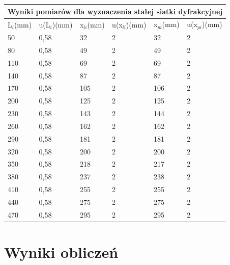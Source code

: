 \documentclass[12pt]{article}
\begin{document}
\begin{table}[!ht]
    \centering
    \begin{tabular}{|l|l|l|l|l|l|}
    \hline
    \multicolumn{6}{|l|}{Wyniki pomiarów dla wyznaczenia stałej siatki dyfrakcyjnej} \\
    \hline
        L$_i$(mm) & u(L$_i$)(mm) & x$_{li}$(mm) & u(x$_{li}$)(mm) & x$_{pi}$(mm) & u(x$_{pi}$)(mm) \\ \hline
        50 & 0,58 & 32 & 2 & 32 & 2 \\ \hline
        80 & 0,58 & 49 & 2 & 49 & 2 \\ \hline
        110 & 0,58 & 69 & 2 & 69 & 2 \\ \hline
        140 & 0,58 & 87 & 2 & 87 & 2 \\ \hline
        170 & 0,58 & 105 & 2 & 106 & 2 \\ \hline
        200 & 0,58 & 125 & 2 & 125 & 2 \\ \hline
        230 & 0,58 & 143 & 2 & 144 & 2 \\ \hline
        260 & 0,58 & 162 & 2 & 162 & 2 \\ \hline
        290 & 0,58 & 181 & 2 & 181 & 2 \\ \hline
        320 & 0,58 & 200 & 2 & 200 & 2 \\ \hline
        350 & 0,58 & 218 & 2 & 217 & 2 \\ \hline
        380 & 0,58 & 237 & 2 & 238 & 2 \\ \hline
        410 & 0,58 & 255 & 2 & 255 & 2 \\ \hline
        440 & 0,58 & 275 & 2 & 275 & 2 \\ \hline
        470 & 0,58 & 295 & 2 & 295 & 2 \\ \hline
    \end{tabular}
\end{table}

\section{Wyniki obliczeń}
\end{document}
